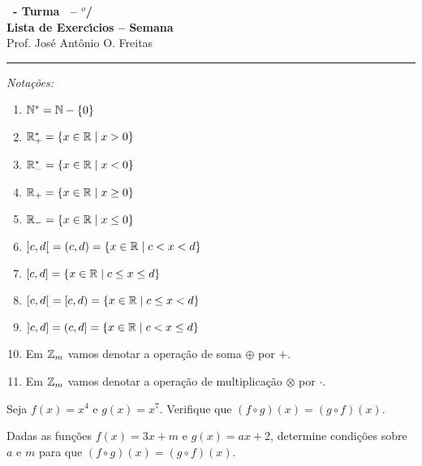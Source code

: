 \documentclass[12pt]{exam}
\begin{document}
    \begin{center}
    {\Large\bf \disciplina\ - Turma \turma\ -- \semestre$^{o}$/\ano} \\ \vspace{9pt} {\large\bf
        Lista de Exerc{\'\i}cios -- Semana \numerosemana}\\ \vspace{9pt} Prof. Jos{\'e} Ant{\^o}nio O. Freitas
    \end{center}
    \hrule

    \vspace{.6cm}

    \begin{center}
    \textit{Nota\c{c}\~oes:}
\end{center}
\begin{multicols}{2}
    \begin{enumerate}[label={\roman*})]
        \item $\mathbb{N}^* = \mathbb{N} - \{0\}$
        \item $\mathbb{R}^*_+ = \{x \in \mathbb{R} \mid x > 0\}$
        \item $\mathbb{R}^*_- = \{x \in \mathbb{R} \mid x < 0\}$
        \item $\mathbb{R}_+ = \{x \in \mathbb{R} \mid x \ge 0\}$
        \item $\mathbb{R}_- = \{x \in \mathbb{R} \mid x \le 0\}$
        \item $]c,d[\ = (c,d) = \{x \in \mathbb{R} \mid c < x < d\}$
        \item $[c,d] = \{x \in \mathbb{R} \mid c \le x \le d\}$
        \item $[c,d[\ = [c, d) = \{x \in \mathbb{R} \mid c \le x < d\}$
        \item $]c,d] = (c, d] = \{x \in \mathbb{R} \mid c < x \le d\}$
        \item Em $\mathbb{Z}_m$ vamos denotar a opera\c{c}\~ao de soma $\oplus$ por $+$.
        \item Em $\mathbb{Z}_m$ vamos denotar a opera\c{c}\~ao de multiplica\c{c}\~ao $\otimes$ por $\cdot$.
    \end{enumerate}
\end{multicols}

\vspace{.6cm}


\questao{} Seja $f(x) = x^4$ e $g(x) = x^7$. Verifique que $(f\circ g)(x) = (g\circ f)(x)$.

\vspace{.3cm}

\questao{} Dadas as fun\c{c}\~oes $f(x) = 3x + m$ e $g(x) = ax + 2$, determine condi\c{c}\~oes sobre $a$ e $m$ para que $(f\circ g)(x) = (g\circ f)(x)$.
\end{document}
